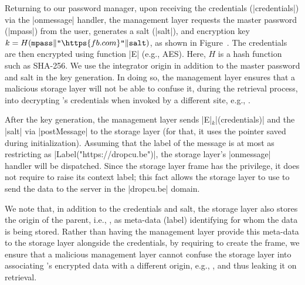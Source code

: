 Returning to our password manager, upon receiving the credentials
(\js|credentials|) via the \js|onmessage| handler, the management
layer requests the master password (\js|mpass|) from the user, 
generates a salt (\js|salt|), and encryption key $k =
H(\texttt{mpass}\|\texttt{"}\https{fb.com}\texttt{"}\|\texttt{salt})$,
as shown in Figure~.
%
The credentials are then encrypted using function \js|E| (e.g., AES).
% 
Here, $H$ is a hash function such as SHA-256.
%
We use the integrator origin in addition to the master
password and salt in the key generation.
%
In doing so, the management layer ensures that a malicious storage
layer will not be able to confuse it, during the retrieval process,
into decrypting 's credentials when invoked by a
different site, e.g., .

After the key generation, the management layer sends
\js|E|$_k$\js|(credentials)| and the \js|salt| via \js|postMessage| to the
storage layer (for that, it uses the pointer saved during initialization).
%
Assuming that the label of the message is at most as restricting as
\js|Label("https://dropcu.be")|, the storage layer's \js|onmessage|
handler will be dispatched. 
%
Since the storage layer frame has the  privilege, it does not
require to raise its context label; this fact allows the storage layer to use
\xhr{} to send the data to the server in the \js|dropcu.be| domain.
 
We note that, in addition to the credentials and salt, the storage
layer also stores the origin of the parent, i.e., , as
meta-data (label) identifying for whom the data is being stored.
%
Rather than having the management layer provide this meta-data to the
storage layer alongside the credentials, by requiring 
to create the frame, we ensure that a malicious management layer
cannot confuse the storage layer into associating 's
encrypted data with a different origin, e.g., , and thus
leaking it on retrieval.

